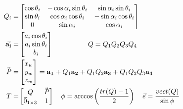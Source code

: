 \documentclass[conference]{IEEEtran}
\begin{document}
\begin{align}
    Q_i =                       & \begin{bmatrix}
                                      \cos \theta_i & - \cos \alpha_i \sin \theta_i & \sin \alpha_i \sin \theta_i   \\
                                      \sin \theta_i & \cos \alpha_i \cos \theta_i   & - \sin \alpha_i \cos \theta_i \\
                                      0             & \sin \alpha_i                 & \cos \alpha_i
                                  \end{bmatrix} \label{eq:Q}                                                             \\
    \vec{\mathbf{a_i}} =        & \begin{bmatrix}
                                      a_i \cos \theta_i \\
                                      a_i \sin \theta_i \\
                                      b_i
                                  \end{bmatrix} \hspace{50px} Q=Q_1 Q_2 Q_3 Q_4 \label{eq:a}                                                                                \\
    \vec{\mathbf{\mathit{P}}} = & \begin{bmatrix}
                                      x_w \\
                                      y_w \\
                                      z_w
                                  \end{bmatrix} = \mathbf{a_1} + Q_1 \mathbf{a_2} + Q_1 Q_2 \mathbf{a_3} + Q_1 Q_2 Q_3 \mathbf{a_4} \label{eq:P}                            \\
    T =                         & \begin{bmatrix}
                                      Q                  & \vec{\mathbf{\mathit{P}}} \\
                                      \vec{0}_{1\times3} & 1
                                  \end{bmatrix} \hspace{10px} \phi = \arccos\left(\frac{tr(Q) - 1}{2}\right) \hspace{10px} \vec{e} = \frac{vect(Q)}{\sin \phi} \label{eq:T}
\end{align}
\end{document}

